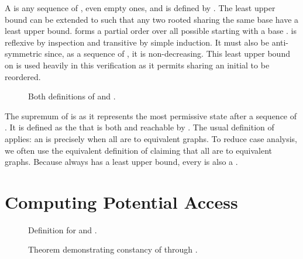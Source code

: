 A \TMpotTransfer{} is any sequence of \TMtransfers{}, even empty ones, and is defined by \COQpotTransfer{}.
The \COQtransfer{} least upper bound can be extended to \COQpotTransfer{} such that any two \TMpotTransfers{} rooted sharing the same base have a least upper bound.
\xmakefirstuc{\TMpotTransfer{}} forms a partial order over all possible \TMtransfers{} starting with a base \TMaccessGraph{}.
\xmakefirstuc{\TMpotTransfer{}} is reflexive by inspection and transitive by simple induction.
It must also be anti-symmetric since, as a sequence of \TMtransfers{}, it is non-decreasing.
This least upper bound on \TMpotTransfer{} is used heavily in this verification as it permits \TMtransfers{} sharing an initial \TMaccessGraph{} to be reordered.

\begin{figure}
  \COQDOCmaxTrans{}
  \COQDOCmaxPotTrans{}
  \COQDOCmaxTransferMaxPotTransfer{}
  \COQDOCpotAcc{}
  \caption{Both definitions of \TMmaximal{} and \COQpotAcc{}.\label{fig:access:potAcc}}
\end{figure}
  
The supremum of \TMpotTransfer{} is \term{\TMpotAcc{}} as it represents the most permissive state after a sequence of \TMtransfers{}.
It is defined as the \TMaccessGraph{} that is both \TMmaximal{} and reachable by \TMpotTransfer{}.
The usual definition of \term{\TMmaximal{}} applies: an \TMaccessGraph{} is \TMmaximal{} precisely when all \TMpotTransfers{} are to equivalent graphs.
To reduce case analysis, we often use the equivalent definition of \TMmaximal{} claiming that all \TMtransfers{} are to equivalent graphs.
Because \TMpotTransfer{} always has a least upper bound, every \TMmaximal{} \TMaccessGraph{} is also a \TMpotAccAG{}.

\section{Computing Potential Access}

\begin{figure}
  \COQDOCagObjsSpec{}
  \COQDOCcompleteAgSpec{}
  \caption{Definition for \COQagObjsSpec{} and \COQcompleteAgSpec{}. \label{fig:access:agObjs}}
\end{figure}

\begin{figure}
  \COQDOCAGallObjs{}
  \COQDOCagObjsSpecAGallObjs{}
  \COQDOCagAllObjsTransfer{}
  \caption{Theorem demonstrating constancy of \TMagObjs{} through \TMtransfer{}. \label{fig:access:agObjsTransfer}}
\end{figure}

